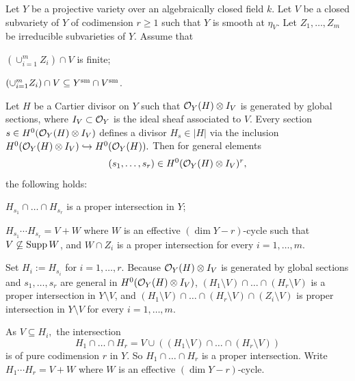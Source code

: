 \documentclass[12pt]{amsart}
\begin{document}
\begin{pro}\label{probertini}Let $Y$ be a projective variety over an algebraically closed field $k$.
Let $V$ be a closed subvariety of $Y$ of codimension $r\geq 1$ such that $Y$ is smooth at $\eta_V.$
Let $Z_1,\dots,Z_m$ be irreducible subvarieties of $Y$.
Assume that 
\begin{points}
\item[$\bullet$] $(\cup_{i=1}^m Z_i)\cap V$ is finite; 
\item[$\bullet$] $(\cup_{i=1}^m Z_i)\cap V\subseteq Y^{{\rm sm}}\cap V^{{\rm sm}}$.
\end{points}
Let $H$ be a Cartier divisor on $Y$ such that ${\mathcal O}_Y(H)\otimes I_V$ is generated by global sections, where
 $I_V\subset {\mathcal O}_Y$ is the ideal sheaf associated to $V$.
Every section $s\in H^0({\mathcal O}_Y(H)\otimes I_V)$ defines a divisor 
$H_s\in |H|$ via the inclusion $H^0({\mathcal O}_Y(H)\otimes I_V)\hookrightarrow H^0({\mathcal O}_Y(H)).$
Then for general elements 
$$(s_1,\dots, s_r)\in H^0({\mathcal O}_Y(H)\otimes I_V)^r,$$ 
the following holds:
\begin{points}
\item $H_{s_1}\cap\dots\cap H_{s_r}$ is a proper intersection in $Y$;
\item $H_{s_1}\cdots H_{s_r}=V+W$ where $W$ is an effective $(\dim Y-r)$-cycle such that 
$V\not\subseteq {\rm Supp} \,W$, and $W\cap Z_i$ is a proper intersection for every $i=1,\dots,m$.
\end{points}
\end{pro}


\proof
Set $H_i:=H_{s_i}$ for $i=1,\dots,r.$
Because ${\mathcal O}_Y(H)\otimes I_V$ is generated by global sections and $s_1,\dots, s_r$ are general in $H^0({\mathcal O}_Y(H)\otimes I_V)$, 
$(H_1\setminus V)\cap\dots\cap  (H_r\setminus V)$ is a proper intersection in $Y\setminus V$, and 
$(H_1\setminus V)\cap\dots\cap  (H_r\setminus V)\cap (Z_i\setminus V)$ is proper intersection in $Y\setminus V$ for every $i=1,\dots,m$.

\medskip

As $V\subseteq H_i,$ the intersection 
$$H_1\cap \dots \cap H_r= V\cup ((H_1\setminus V)\cap\dots\cap  (H_r\setminus V))
$$
 is of pure codimension $r$ in $Y$.
So $H_1\cap \dots \cap H_r$ is a proper intersection. 
Write $H_{1}\cdots H_{r}=V+W$ where $W$ is an effective $(\dim Y-r)$-cycle.
\end{document}

